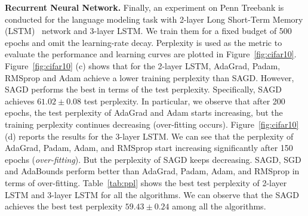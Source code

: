 \documentclass[11pt]{article}
\begin{document}
\textbf{Recurrent Neural Network.}
Finally, an experiment on Penn Treebank is conducted for the language modeling task with 2-layer Long Short-Term Memory (LSTM)~\citep{stni2018} network and 3-layer LSTM. We train them for a fixed budget of 500 epochs and omit the learning-rate decay. Perplexity is used as the metric to evaluate the performance and learning curves are plotted in Figure~\ref{fig:cifar10}. 
Figure~\ref{fig:cifar10} (c) shows that for the 2-layer LSTM, AdaGrad, Padam, RMSprop and Adam achieve a lower training perplexity than \textsc{SAGD}. However, \textsc{SAGD} performs the best in terms of the test perplexity. Specifically, \textsc{SAGD} achieves $61.02 \pm 0.08$ test perplexity. 
In particular, we observe that after 200 epochs, the test perplexity of AdaGrad and Adam starts increasing, but the training perplexity continues decreasing (over-fitting occurs).  
Figure~\ref{fig:cifar10} (d) reports the results for the 3-layer LSTM. We can see that the perplexity of AdaGrad, Padam, Adam, and RMSprop start increasing significantly after 150 epochs (\emph{over-fitting}). But the perplexity of \textsc{SAGD} keeps decreasing. \textsc{SAGD}, SGD and AdaBounds perform better than AdaGrad, Padam, Adam, and RMSprop in terms of over-fitting.
Table~\ref{tab:ppl} shows the best test perplexity of 2-layer LSTM and 3-layer LSTM for all the algorithms. We can observe that the \textsc{SAGD} achieves the best test perplexity $59.43 \pm 0.24$ among all the algorithms. 

\begin{table}[H]
\small
\caption{ Test Perplexity of LSTMs on Penn Treebank. Bold number indicates the best result.}\label{tab:ppl}
	\vspace{-0.1in}
\end{table}


\vspace{-0.05in}
\end{document}
